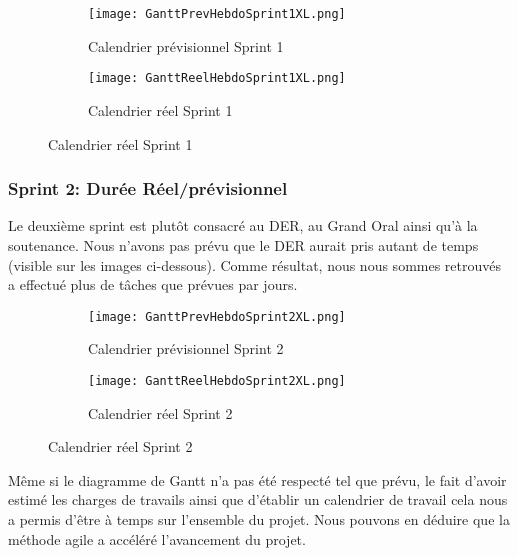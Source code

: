 \begin{figure}
   \centering
   \begin{subfigure}{.5\textwidth}
     \centering
     \texttt{[image: GanttPrevHebdoSprint1XL.png]}
   	\caption[]{Calendrier prévisionnel Sprint 1}
   	\label{fig:gantPrevHebdo}
   \end{subfigure}%
   \begin{subfigure}{.5\textwidth}
     \centering
     \texttt{[image: GanttReelHebdoSprint1XL.png]}
   	\caption[]{Calendrier réel Sprint 1}
   	\label{fig:GantReelHebdo}
   \end{subfigure}
\end{figure}


\subsubsection{Sprint 2: Durée Réel/prévisionnel}
Le deuxième sprint est plutôt consacré au DER, au Grand Oral ainsi qu'à la soutenance.
Nous n'avons pas prévu que le DER aurait pris autant de temps (visible sur les images ci-dessous).
Comme résultat, nous nous sommes retrouvés a effectué plus de tâches que prévues par jours. 

\begin{figure}
  \centering
  \begin{subfigure}{.5\textwidth}
    \centering
    \texttt{[image: GanttPrevHebdoSprint2XL.png]}
  	\caption[]{Calendrier prévisionnel Sprint 2}
  	\label{}
  \end{subfigure}%
  \begin{subfigure}{.5\textwidth}
    \centering
    \texttt{[image: GanttReelHebdoSprint2XL.png]}
  	\caption[]{Calendrier réel Sprint 2}
  	\label{}
  \end{subfigure}
\end{figure}

Même si le diagramme de Gantt n'a pas été respecté tel que prévu, le fait d’avoir estimé les charges de travails ainsi que d'établir un calendrier de travail cela nous a permis d'être à temps sur l'ensemble du projet.
Nous pouvons en déduire que la méthode agile a accéléré l'avancement du projet.








